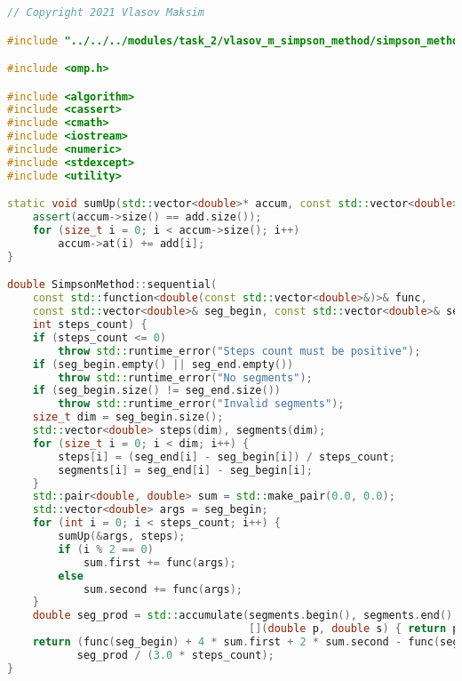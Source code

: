 \documentclass{report}
\begin{document}
\begin{lstlisting}[language=C++]
// Copyright 2021 Vlasov Maksim

#include "../../../modules/task_2/vlasov_m_simpson_method/simpson_method.h"

#include <omp.h>

#include <algorithm>
#include <cassert>
#include <cmath>
#include <iostream>
#include <numeric>
#include <stdexcept>
#include <utility>

static void sumUp(std::vector<double>* accum, const std::vector<double>& add) {
    assert(accum->size() == add.size());
    for (size_t i = 0; i < accum->size(); i++)
        accum->at(i) += add[i];
}

double SimpsonMethod::sequential(
    const std::function<double(const std::vector<double>&)>& func,
    const std::vector<double>& seg_begin, const std::vector<double>& seg_end,
    int steps_count) {
    if (steps_count <= 0)
        throw std::runtime_error("Steps count must be positive");
    if (seg_begin.empty() || seg_end.empty())
        throw std::runtime_error("No segments");
    if (seg_begin.size() != seg_end.size())
        throw std::runtime_error("Invalid segments");
    size_t dim = seg_begin.size();
    std::vector<double> steps(dim), segments(dim);
    for (size_t i = 0; i < dim; i++) {
        steps[i] = (seg_end[i] - seg_begin[i]) / steps_count;
        segments[i] = seg_end[i] - seg_begin[i];
    }
    std::pair<double, double> sum = std::make_pair(0.0, 0.0);
    std::vector<double> args = seg_begin;
    for (int i = 0; i < steps_count; i++) {
        sumUp(&args, steps);
        if (i % 2 == 0)
            sum.first += func(args);
        else
            sum.second += func(args);
    }
    double seg_prod = std::accumulate(segments.begin(), segments.end(), 1.0,
                                      [](double p, double s) { return p * s; });
    return (func(seg_begin) + 4 * sum.first + 2 * sum.second - func(seg_end)) *
           seg_prod / (3.0 * steps_count);
}


\end{lstlisting}
\end{document}
